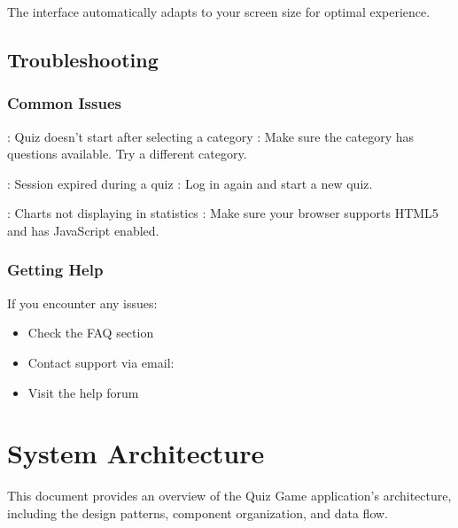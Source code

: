 \documentclass[letterpaper,10pt,english]{sphinxmanual}
\begin{document}
\sphinxAtStartPar
The interface automatically adapts to your screen size for optimal experience.


\subsection{Troubleshooting}
\label{\detokenize{user_guide:troubleshooting}}

\subsubsection{Common Issues}
\label{\detokenize{user_guide:common-issues}}
\sphinxAtStartPar
{}: Quiz doesn’t start after selecting a category
: Make sure the category has questions available. Try a different category.

\sphinxAtStartPar
{}: Session expired during a quiz
: Log in again and start a new quiz.

\sphinxAtStartPar
{}: Charts not displaying in statistics
: Make sure your browser supports HTML5 and has JavaScript enabled.


\subsubsection{Getting Help}
\label{\detokenize{user_guide:getting-help}}
\sphinxAtStartPar
If you encounter any issues:
\begin{itemize}
\item {} 
\sphinxAtStartPar
Check the FAQ section

\item {} 
\sphinxAtStartPar
Contact support via email: 

\item {} 
\sphinxAtStartPar
Visit the help forum

\end{itemize}

\sphinxstepscope


\section{System Architecture}
\label{\detokenize{architecture:system-architecture}}\label{\detokenize{architecture::doc}}
\sphinxAtStartPar
This document provides an overview of the Quiz Game application’s architecture,
including the design patterns, component organization, and data flow.
\end{document}
